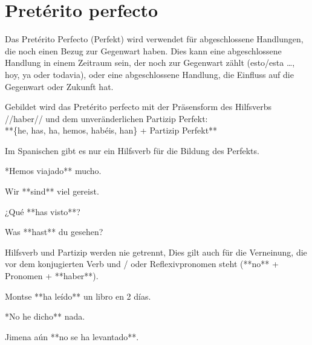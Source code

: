 \section*{Pretérito perfecto}

\begin{highlight}
Das Pretérito Perfecto (Perfekt) wird verwendet für abgeschlossene Handlungen, die noch einen
Bezug zur Gegenwart haben. Dies kann eine abgeschlossene Handlung in einem Zeitraum sein, der
noch zur Gegenwart zählt (esto/esta \ldots, hoy, ya oder todavia), oder eine abgeschlossene Handlung,
die Einfluss auf die Gegenwart oder Zukunft hat.
\end{highlight}

\begin{highlight}
Gebildet wird das Pretérito perfecto mit der Präsensform des Hilfsverbs //haber// und dem
unveränderlichen Partizip Perfekt:\\
**\{he, has, ha, hemos, habéis, han\} + Partizip Perfekt**
\end{highlight}

\begin{hint}
\danger{}
Im Spanischen gibt es nur ein Hilfsverb
für die Bildung des Perfekts.
\end{hint}

\begin{multicols}{2}
\begin{compactitem}
    \item **Hemos viajado** mucho.
    \begin{compactitem}\itshape
        \item Wir **sind** viel gereist.
    \end{compactitem}
    \item ¿Qué **has visto**?
    \begin{compactitem}\itshape
        \item Was **hast** du gesehen?
    \end{compactitem}
\end{compactitem}
\end{multicols}

\begin{hint}
Hilfsverb und Partizip werden nie getrennt, Dies gilt auch für die Verneinung,
die vor dem konjugierten Verb und / oder Reflexivpronomen steht
(**no** + Pronomen + **haber**).
\end{hint}

\begin{compactitem}
    \item Montse **ha leído** un libro en 2 días.
    \item **No he dicho** nada.
    \item Jimena aún **no se ha levantado**.
\end{compactitem}

